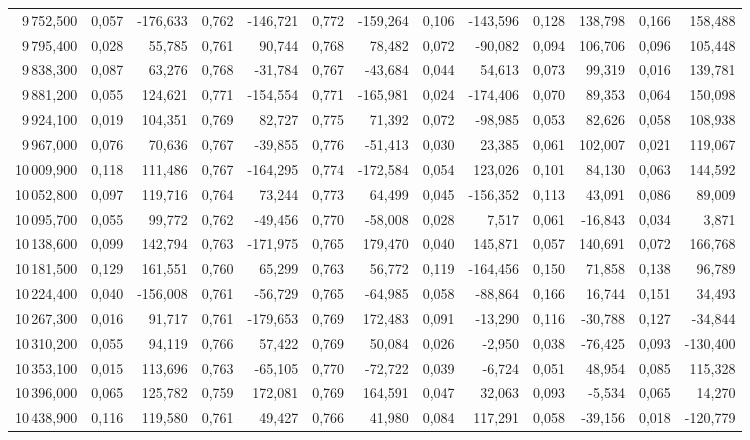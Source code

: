 \begin{longtable}{rrrrrrrrrrrrr}
9\,752,500 & 0,057 & -176,633 & 0,762 & -146,721 & 0,772 & -159,264 & 0,106 & -143,596 & 0,128 & 138,798 & 0,166 & 158,488\\
9\,795,400 & 0,028 & 55,785 & 0,761 & 90,744 & 0,768 & 78,482 & 0,072 & -90,082 & 0,094 & 106,706 & 0,096 & 105,448\\
9\,838,300 & 0,087 & 63,276 & 0,768 & -31,784 & 0,767 & -43,684 & 0,044 & 54,613 & 0,073 & 99,319 & 0,016 & 139,781\\
9\,881,200 & 0,055 & 124,621 & 0,771 & -154,554 & 0,771 & -165,981 & 0,024 & -174,406 & 0,070 & 89,353 & 0,064 & 150,098\\
9\,924,100 & 0,019 & 104,351 & 0,769 & 82,727 & 0,775 & 71,392 & 0,072 & -98,985 & 0,053 & 82,626 & 0,058 & 108,938\\
9\,967,000 & 0,076 & 70,636 & 0,767 & -39,855 & 0,776 & -51,413 & 0,030 & 23,385 & 0,061 & 102,007 & 0,021 & 119,067\\
10\,009,900 & 0,118 & 111,486 & 0,767 & -164,295 & 0,774 & -172,584 & 0,054 & 123,026 & 0,101 & 84,130 & 0,063 & 144,592\\
10\,052,800 & 0,097 & 119,716 & 0,764 & 73,244 & 0,773 & 64,499 & 0,045 & -156,352 & 0,113 & 43,091 & 0,086 & 89,009\\
10\,095,700 & 0,055 & 99,772 & 0,762 & -49,456 & 0,770 & -58,008 & 0,028 & 7,517 & 0,061 & -16,843 & 0,034 & 3,871\\
10\,138,600 & 0,099 & 142,794 & 0,763 & -171,975 & 0,765 & 179,470 & 0,040 & 145,871 & 0,057 & 140,691 & 0,072 & 166,768\\
10\,181,500 & 0,129 & 161,551 & 0,760 & 65,299 & 0,763 & 56,772 & 0,119 & -164,456 & 0,150 & 71,858 & 0,138 & 96,789\\
10\,224,400 & 0,040 & -156,008 & 0,761 & -56,729 & 0,765 & -64,985 & 0,058 & -88,864 & 0,166 & 16,744 & 0,151 & 34,493\\
10\,267,300 & 0,016 & 91,717 & 0,761 & -179,653 & 0,769 & 172,483 & 0,091 & -13,290 & 0,116 & -30,788 & 0,127 & -34,844\\
10\,310,200 & 0,055 & 94,119 & 0,766 & 57,422 & 0,769 & 50,084 & 0,026 & -2,950 & 0,038 & -76,425 & 0,093 & -130,400\\
10\,353,100 & 0,015 & 113,696 & 0,763 & -65,105 & 0,770 & -72,722 & 0,039 & -6,724 & 0,051 & 48,954 & 0,085 & 115,328\\
10\,396,000 & 0,065 & 125,782 & 0,759 & 172,081 & 0,769 & 164,591 & 0,047 & 32,063 & 0,093 & -5,534 & 0,065 & 14,270\\
10\,438,900 & 0,116 & 119,580 & 0,761 & 49,427 & 0,766 & 41,980 & 0,084 & 117,291 & 0,058 & -39,156 & 0,018 & -120,779\\

\end{longtable}
